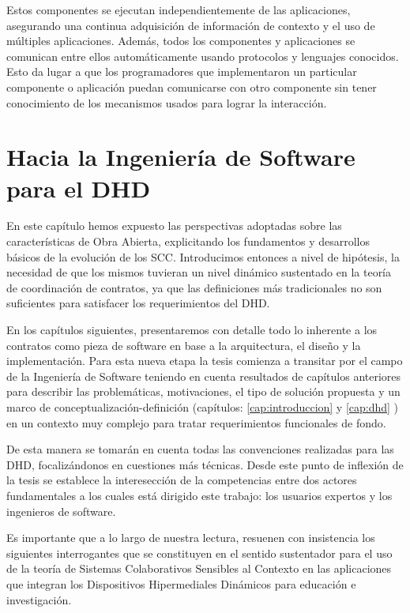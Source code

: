 Estos componentes se ejecutan independientemente de las aplicaciones, asegurando
una
continua adquisición de información de contexto y el uso de múltiples
aplicaciones.
Además, todos los componentes y aplicaciones se comunican entre ellos
automáticamente usando protocolos y lenguajes conocidos. Esto da lugar a que los
programadores que implementaron un particular componente o aplicación puedan
comunicarse con otro componente sin tener conocimiento de los mecanismos usados
para lograr la interacción.

\section{Hacia la Ingeniería de Software para el DHD}
 
En este capítulo hemos expuesto las perspectivas adoptadas sobre las
características de
Obra Abierta, explicitando los fundamentos y desarrollos básicos de la evolución
de los
SCC. Introducimos entonces a nivel de
hipótesis, la necesidad de que
los mismos tuvieran un nivel dinámico sustentado en la teoría de coordinación de
contratos, ya que las definiciones más tradicionales no son suficientes para
satisfacer los
requerimientos del DHD.

En los capítulos siguientes, presentaremos con detalle todo lo inherente a los
contratos
como pieza de software en base a la arquitectura, el dise\~no y la
implementación. Para esta nueva etapa la tesis comienza a transitar por el
campo de la Ingeniería de Software teniendo en cuenta  resultados
de capítulos anteriores para describir las problemáticas, motivaciones,
el tipo de solución propuesta y un marco de conceptualización-definición
(capítulos: \ref{cap:introduccion} y \ref{cap:dhd} ) en un contexto muy
complejo para tratar requerimientos funcionales de fondo. 

De esta manera se tomarán en cuenta todas las convenciones realizadas para las
DHD, focalizándonos en cuestiones más técnicas. Desde este punto de
inflexión de la tesis se establece la interesección de la competencias entre
dos actores fundamentales a los cuales está dirigido este trabajo: los usuarios
expertos y los ingenieros de software. 

Es importante que a lo largo de nuestra lectura, resuenen con insistencia los
siguientes interrogantes que se constituyen en el sentido sustentador para el
uso de la teoría de Sistemas Colaborativos Sensibles al Contexto en las
aplicaciones que integran los Dispositivos Hipermediales Dinámicos para
educación e investigación. 


